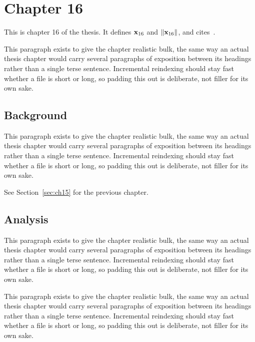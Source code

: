\section{Chapter 16}
\label{sec:ch16}

This is chapter 16 of the thesis. It defines $\mathbf{x}_{16}$ and $\lVert \mathbf{x}_{16} \rVert$, and cites~\cite{ref1}.

This paragraph exists to give the chapter realistic bulk, the same way an actual thesis chapter would carry several paragraphs of exposition between its headings rather than a single terse sentence. Incremental reindexing should stay fast whether a file is short or long, so padding this out is deliberate, not filler for its own sake.

\subsection{Background}
\label{sec:ch16:background}

This paragraph exists to give the chapter realistic bulk, the same way an actual thesis chapter would carry several paragraphs of exposition between its headings rather than a single terse sentence. Incremental reindexing should stay fast whether a file is short or long, so padding this out is deliberate, not filler for its own sake.

See Section~\ref{sec:ch15} for the previous chapter.

\subsection{Analysis}
\label{sec:ch16:analysis}

This paragraph exists to give the chapter realistic bulk, the same way an actual thesis chapter would carry several paragraphs of exposition between its headings rather than a single terse sentence. Incremental reindexing should stay fast whether a file is short or long, so padding this out is deliberate, not filler for its own sake.

This paragraph exists to give the chapter realistic bulk, the same way an actual thesis chapter would carry several paragraphs of exposition between its headings rather than a single terse sentence. Incremental reindexing should stay fast whether a file is short or long, so padding this out is deliberate, not filler for its own sake.
